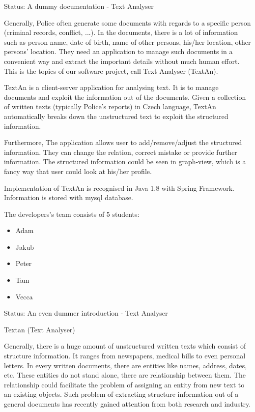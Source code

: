 Status: A dummy documentation - Text Analyser

Generally, Police often generate some documents with regards to a specific person (criminal records, conflict, ...). 
In the documents, there is a lot of information such as person name, date of birth, name of other persons, his/her 
location, other persons' location. They need an application to manage such documents in a convenient way and extract the 
important details without much human effort. This is the topics of our software project, call Text Analyser (TextAn).

TextAn is a client-server application for analysing text. It is to manage documents and exploit the information out of the 
documents. Given a collection of written texts (typically Police's reports) in Czech language, TextAn automatically breaks 
down the unstructured text to exploit the structured information. 

Furthermore, The application allows user to add/remove/adjust the structured information. They can change the relation, 
correct mistake or provide further information. The structured information could be seen in graph-view, which is a fancy 
way that user could look at his/her profile. 

Implementation of TextAn is recognised in Java 1.8 with Spring Framework. Information is stored with mysql database.

The developers's team consists of 5 students:

\begin{itemize}
\item Adam
\item Jakub
\item Peter
\item Tam
\item Vecca
\end{itemize}

Status: An even dummer introduction - Text Analyser

Textan (Text Analyser)

Generally, there is a huge amount of unstructured written texts which consist of structure information. It ranges from 
newspapers, medical bills to even personal letters. In every written documents, there are entities like names, address, 
dates, etc. These entities do not stand alone, there are relationship between them. The relationship could facilitate the 
problem of assigning an entity from new text to an existing objects. Such problem of extracting structure information out 
of a general documents has recently gained attention from both research and industry.

